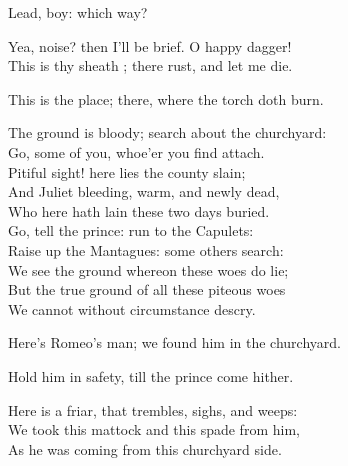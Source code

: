 \begin{speech}
 Lead, boy: which way? \\

\end{speech}
\begin{speech}
Yea, noise? then I'll be brief.   O happy dagger!
 \\
This is thy sheath  ; there rust, and let me die.
 
\\
\end{speech}
\begin{speech}
This is the place; there, where the
 torch doth burn.
\end{speech}
\begin{speech}
The ground is bloody; search about the churchyard:
\\
Go, some of you, whoe'er you find attach. \\
Pitiful sight! here lies the county slain; \\
And Juliet bleeding, warm, and newly dead, \\
Who here hath lain these two days buried. \\
Go, tell the prince: run to the Capulets: \\
Raise up the Mantagues: some others search: \\
We see the ground whereon these woes do lie; \\
But the true ground of all these piteous woes \\
We cannot without circumstance descry. 
\\
\end{speech}
\begin{speech}
Here's Romeo's man; we found him in the churchyard.
\\
\end{speech}
\begin{speech}
Hold him in safety, till the prince come hither.
 \\
\end{speech}
\begin{speech}
Here is a friar, that trembles, sighs, and weeps:
\\
We took this mattock and this spade from him, \\
As he was coming from this churchyard side. \\
\end{speech}
